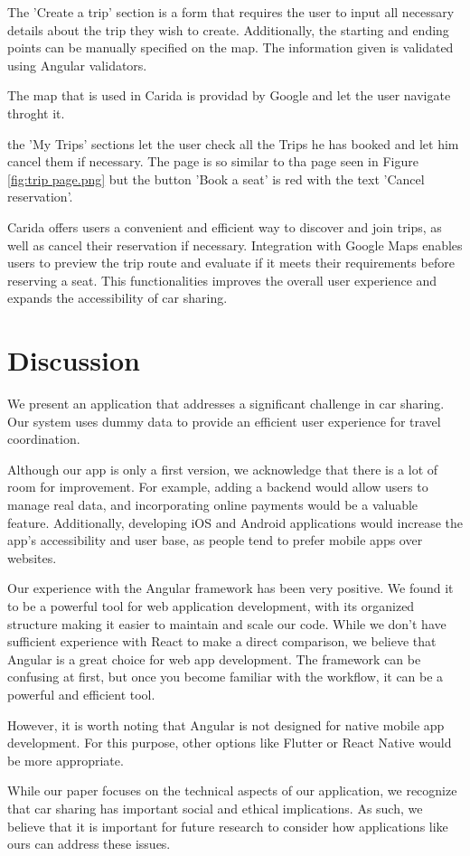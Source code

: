 \documentclass{article}
\begin{document}
    The 'Create a trip' section is a form that requires the user to input all necessary details about the trip they wish to create. Additionally, the starting and ending points can be manually specified on the map. The information given is validated using Angular validators.

    The map that is used in Carida is providad by Google and let the user navigate throght it.

    the 'My Trips' sections let the user check all the Trips he has booked and let him cancel them if necessary. The page is so similar to tha page seen in Figure \ref{fig:trip page.png} but the button 'Book a seat' is red with the text 'Cancel reservation'.
    
    Carida offers users a convenient and efficient way to discover and join trips, as well as cancel their reservation if necessary. Integration with Google Maps enables users to preview the trip route and evaluate if it meets their requirements before reserving a seat. This functionalities improves the overall user experience and expands the accessibility of car sharing.


    \section{Discussion}\label{sec:discussion}

    We present an application \cite{caridaCode} that addresses a significant challenge in car sharing. Our system uses dummy data to provide an efficient user experience for travel coordination. 

    Although our app is only a first version, we acknowledge that there is a lot of room for improvement. For example, adding a backend would allow users to manage real data, and incorporating online payments would be a valuable feature. Additionally, developing iOS and Android applications would increase the app's accessibility and user base, as people tend to prefer mobile apps over websites.

    Our experience with the Angular framework has been very positive. We found it to be a powerful tool for web application development, with its organized structure making it easier to maintain and scale our code. While we don't have sufficient experience with React to make a direct comparison, we believe that Angular is a great choice for web app development. The framework can be confusing at first, but once you become familiar with the workflow, it can be a powerful and efficient tool.

    However, it is worth noting that Angular is not designed for native mobile app development. For this purpose, other options like Flutter or React Native would be more appropriate. 

    While our paper focuses on the technical aspects of our application, we recognize that car sharing has important social and ethical implications. As such, we believe that it is important for future research to consider how applications like ours can address these issues. 




\end{document}
